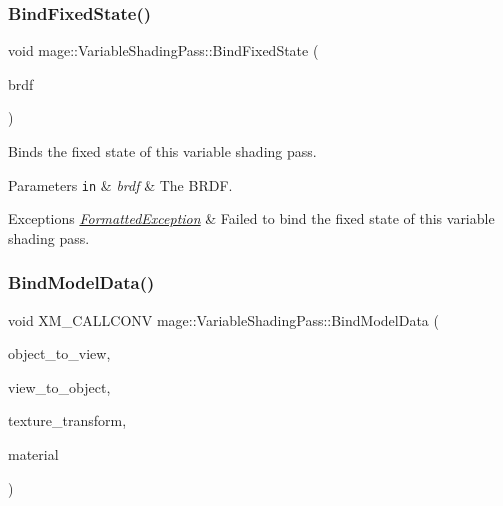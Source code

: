 \subsubsection{\texorpdfstring{Bind\+Fixed\+State()}{BindFixedState()}}
{\footnotesize\ttfamily void mage\+::\+Variable\+Shading\+Pass\+::\+Bind\+Fixed\+State (\begin{DoxyParamCaption}\item[{\hyperlink{namespacemage_ae7a7a03a7b34d7e2689689bb8295cd38}{B\+R\+D\+F\+Type}}]{brdf }\end{DoxyParamCaption})}

Binds the fixed state of this variable shading pass.


\begin{DoxyParams}[1]{Parameters}
\mbox{\tt in}  & {\em brdf} & The B\+R\+DF. \\
\hline
\end{DoxyParams}

\begin{DoxyExceptions}{Exceptions}
{\em \hyperlink{structmage_1_1_formatted_exception}{Formatted\+Exception}} & Failed to bind the fixed state of this variable shading pass. \\
\hline
\end{DoxyExceptions}
\hypertarget{classmage_1_1_variable_shading_pass_a9041b2b7695ede893ea5bc6b5b43e98d}{}\label{classmage_1_1_variable_shading_pass_a9041b2b7695ede893ea5bc6b5b43e98d} 
\subsubsection{\texorpdfstring{Bind\+Model\+Data()}{BindModelData()}}
{\footnotesize\ttfamily void X\+M\+\_\+\+C\+A\+L\+L\+C\+O\+NV mage\+::\+Variable\+Shading\+Pass\+::\+Bind\+Model\+Data (\begin{DoxyParamCaption}\item[{F\+X\+M\+M\+A\+T\+R\+IX}]{object\+\_\+to\+\_\+view,  }\item[{C\+X\+M\+M\+A\+T\+R\+IX}]{view\+\_\+to\+\_\+object,  }\item[{C\+X\+M\+M\+A\+T\+R\+IX}]{texture\+\_\+transform,  }\item[{const \hyperlink{structmage_1_1_material}{Material} $\ast$}]{material }\end{DoxyParamCaption})\hspace{0.3cm}{\ttfamily [private]}}

